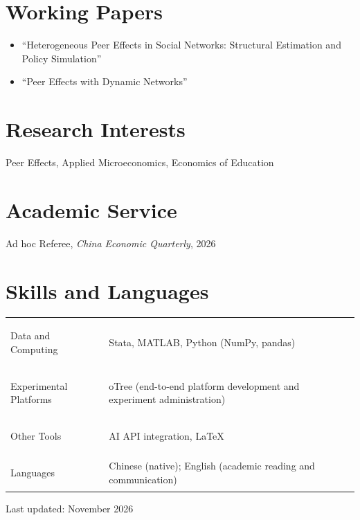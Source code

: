 \documentclass[10pt,a4paper]{article}
\begin{document}
\section*{Working Papers}
\begin{itemize}
  \item ``Heterogeneous Peer Effects in Social Networks: Structural Estimation and Policy Simulation''
  \item ``Peer Effects with Dynamic Networks''
\end{itemize}

\section*{Research Interests}
Peer Effects, Applied Microeconomics, Economics of Education

\section*{Academic Service}
Ad hoc Referee, \textit{China Economic Quarterly}, 2026

\section*{Skills and Languages}
\begin{tabularx}{\textwidth}{@{}>{\bfseries\raggedright\arraybackslash}p{4.3cm}X@{}}
  Data and Computing & Stata, MATLAB, Python (NumPy, pandas) \\
  Experimental Platforms & oTree (end-to-end platform development and experiment administration) \\
  Other Tools & AI API integration, LaTeX \\
  Languages & Chinese (native); English (academic reading and communication)
\end{tabularx}

\vfill
\begin{center}
  {\scriptsize\textcolor{Muted}{Last updated: November 2026}}
\end{center}
\end{document}
